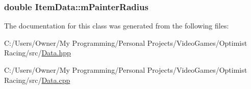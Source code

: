 \hypertarget{class_item_data_a44cc64e866c902fb5999e3169b440372}{
\subsubsection[{m\-Painter\-Radius}]{\setlength{\rightskip}{0pt plus 5cm}double Item\-Data\-::m\-Painter\-Radius}}\label{class_item_data_a44cc64e866c902fb5999e3169b440372}


The documentation for this class was generated from the following files\-:\begin{DoxyCompactItemize}
\item 
C\-:/\-Users/\-Owner/\-My Programming/\-Personal Projects/\-Video\-Games/\-Optimist Racing/src/\hyperlink{_data_8hpp}{Data.\-hpp}\item 
C\-:/\-Users/\-Owner/\-My Programming/\-Personal Projects/\-Video\-Games/\-Optimist Racing/src/\hyperlink{_data_8cpp}{Data.\-cpp}\end{DoxyCompactItemize}
